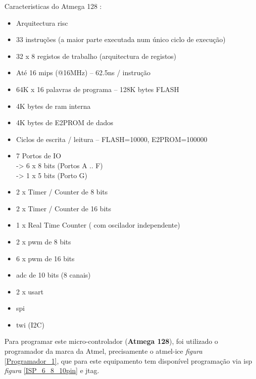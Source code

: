 \begin{minipage}{\linewidth}
{\Large Caracteristicas do Atmega 128 :}
\normalsize
\begin{itemize}	
	\setlength\itemsep{-0.3em}
	\item Arquitectura \acs{risc}
	\item 33 instruções (a maior parte executada num único ciclo de execução)
	\item 32 x 8 registos de trabalho (arquitectura de registos)
	\item Até 16 \acs{mips} (@16MHz) – 62.5ns / instrução
	\item 64K x 16 palavras de programa – 128K bytes FLASH
	\item 4K bytes de \acs{ram} interna
	\item 4K bytes de E2PROM de dados
	\item Ciclos de escrita / leitura – FLASH=10000, E2PROM=100000
	\item 7 Portos de IO \\
		\hspace*{.5cm}	-> 6 x 8 bits (Portos A .. F) \\
		\hspace*{.5cm}	-> 1 x 5 bits (Porto G)
	\item 2 x Timer / Counter de 8 bits
	\item 2 x Timer / Counter de 16 bits
	\item 1 x Real Time Counter ( com oscilador independente)
	\item 2 x \acs{pwm} de 8 bits
	\item 6 x \acs{pwm} de 16 bits
	\item \acs{adc} de 10 bits (8 canais)
	\item 2 x \acs{usart}
	\item \acs{spi}
	\item \acs{twi} (I2C)
\end{itemize}
\end{minipage}
\newpage
Para programar este micro-controlador (\textbf{Atmega 128}), foi utilizado o programador da marca da Atmel, precisamente o \ac{atmel-ice} \textit{figura} \ref{Programador_1}, que para este equipamento tem disponível programação via \ac{isp} \textit{figura} \ref{ISP_6_8_10pin} e \ac{jtag}.
